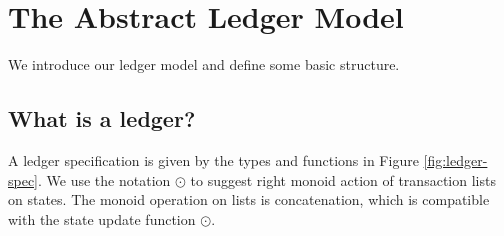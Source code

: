 \section{The Abstract Ledger Model}
\label{sec:model}

We introduce our ledger model and define some basic structure.


\subsection{What is a ledger?}
\label{sec:what}

A ledger specification is given by the types and functions in Figure \ref{fig:ledger-spec}.
We use the notation $\odot$ to suggest right monoid action of transaction lists on states.
The monoid operation on lists is concatenation, which is compatible with the state
update function $\odot$.


